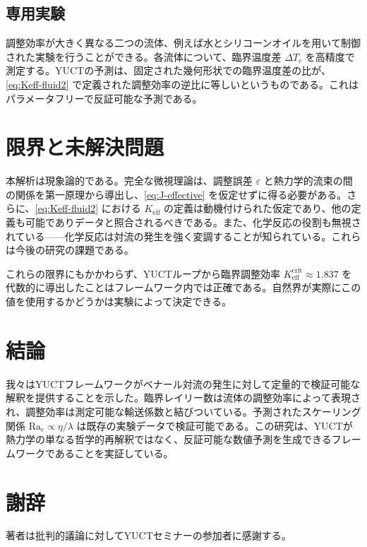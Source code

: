 \documentclass[12pt,a4paper]{article}
\begin{document}
	\subsection{専用実験}
	調整効率が大きく異なる二つの流体、例えば水とシリコーンオイルを用いて制御された実験を行うことができる。各流体について、臨界温度差 \(\Delta T_c\) を高精度で測定する。YUCTの予測は、固定された幾何形状での臨界温度差の比が、\eqref{eq:Keff-fluid2} で定義された調整効率の逆比に等しいというものである。これはパラメータフリーで反証可能な予測である。
	
	\section{限界と未解決問題}
	
	本解析は現象論的である。完全な微視理論は、調整誤差 \(\varepsilon\) と熱力学的流束の間の関係を第一原理から導出し、\eqref{eq:J-effective} を仮定せずに得る必要がある。さらに、\eqref{eq:Keff-fluid2} における \(K_{\mathrm{eff}}\) の定義は動機付けられた仮定であり、他の定義も可能でありデータと照合されるべきである。また、化学反応の役割も無視されている——化学反応は対流の発生を強く変調することが知られている。これらは今後の研究の課題である。
	
	これらの限界にもかかわらず、YUCTループから臨界調整効率 \(K_{\mathrm{eff}}^{\mathrm{crit}} \approx 1.837\) を代数的に導出したことはフレームワーク内では正確である。自然界が実際にこの値を使用するかどうかは実験によって決定できる。
	
	\section{結論}
	
	我々はYUCTフレームワークがベナール対流の発生に対して定量的で検証可能な解釈を提供することを示した。臨界レイリー数は流体の調整効率によって表現され、調整効率は測定可能な輸送係数と結びついている。予測されたスケーリング関係 \(\mathrm{Ra_c} \propto \eta/\lambda\) は既存の実験データで検証可能である。この研究は、YUCTが熱力学の単なる哲学的再解釈ではなく、反証可能な数値予測を生成できるフレームワークであることを実証している。
	
	\section*{謝辞}
	著者は批判的議論に対してYUCTセミナーの参加者に感謝する。
	
\end{document}
